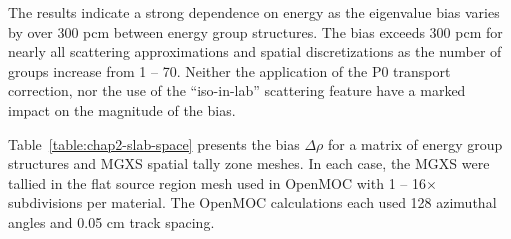 The results indicate a strong dependence on energy as the eigenvalue bias varies by over 300 pcm between energy group structures. The bias exceeds 300 pcm for nearly all scattering approximations and spatial discretizations as the number of groups increase from 1 -- 70. Neither the application of the P0 transport correction, nor the use of the ``iso-in-lab'' scattering feature have a marked impact on the magnitude of the bias.

Table~\ref{table:chap2-slab-space} presents the bias $\Delta\rho$ for a matrix of energy group structures and \ac{MGXS} spatial tally zone meshes. In each case, the \ac{MGXS} were tallied in the flat source region mesh used in OpenMOC with 1 -- 16$\times$ subdivisions per material. The OpenMOC calculations each used 128 azimuthal angles and 0.05 cm track spacing.

